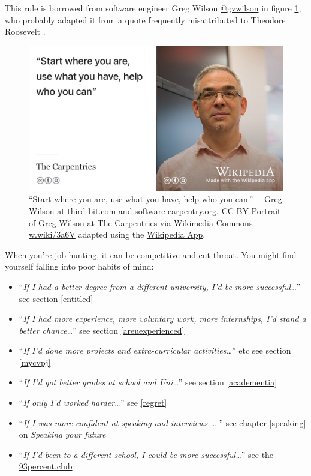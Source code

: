 \documentclass[
]{book}
\providecommand{\tightlist}{%
  \setlength{\itemsep}{0pt}\setlength{\parskip}{0pt}}
\begin{document}
This rule is borrowed from software engineer Greg Wilson \href{https://github.com/gvwilson}{@gvwilson} in figure \ref{fig:greg-wilson-fig}, who probably adapted it from a quote frequently misattributed to Theodore Roosevelt \citep{teddy}.

\begin{figure}

{\centering \includegraphics[width=1\linewidth]{images/greg-wilson-software-carpentry} 

}

\caption{``Start where you are, use what you have, help who you can.'' ---Greg Wilson at \href{https://third-bit.com/}{third-bit.com} and \href{https://software-carpentry.org/}{software-carpentry.org}. CC BY Portrait of Greg Wilson at \href{https://en.wikipedia.org/wiki/The_Carpentries}{The Carpentries} via Wikimedia Commons \href{https://w.wiki/3a6V}{w.wiki/3a6V} adapted using the \href{https://apps.apple.com/gb/app/wikipedia/id324715238}{Wikipedia App}.}\label{fig:greg-wilson-fig}
\end{figure}



When you're job hunting, it can be competitive and cut-throat. You might find yourself falling into poor habits of mind:

\begin{itemize}
\tightlist
\item
  ``\emph{If I had a better degree from a different university, I'd be more successful\ldots{}}'' see section \ref{entitled}
\item
  ``\emph{If I had more experience, more voluntary work, more internships, I'd stand a better chance\ldots{}}'' see section \ref{areuexperienced}
\item
  ``\emph{If I'd done more projects and extra-curricular activities\ldots{}}'' etc see section \ref{mycvpj}
\item
  ``\emph{If I'd got better grades at school and Uni\ldots{}}'' see section \ref{academentia}
\item
  ``\emph{If only I'd worked harder\ldots{}}'' see \ref{regret}
\item
  ``\emph{If I was more confident at speaking and interviews \ldots{} }'' see chapter \ref{speaking} on \emph{Speaking your future}
\item
  ``\emph{If I'd been to a different school, I could be more successful\ldots{}}'' see the \href{https://www.93percent.club/}{93percent.club} \citep{93bbc, 93guardian}
\end{itemize}
\end{document}
